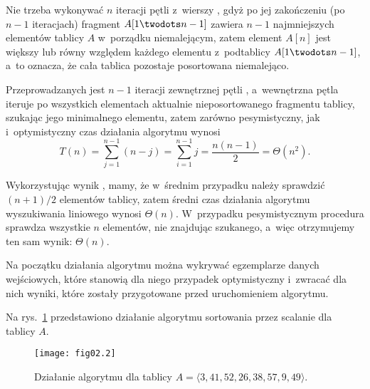 Nie trzeba wykonywać $n$ iteracji pętli  z~wierszy \twodashes{\ref{li:selection-sort-for-begin}}{\ref{li:selection-sort-for-end}}, gdyż po jej zakończeniu (po $n-1$ iteracjach) fragment $A[1\twodots n-1]$ zawiera $n-1$ najmniejszych elementów tablicy $A$ w~porządku niemalejącym, zatem element $A[n]$ jest większy lub równy względem każdego elementu z~podtablicy $A[1\twodots n-1]$, a~to oznacza, że cała tablica pozostaje posortowana niemalejąco.

Przeprowadzanych jest $n-1$ iteracji zewnętrznej pętli , a~wewnętrzna pętla  iteruje po wszystkich elementach aktualnie nieposortowanego fragmentu tablicy, szukając jego minimalnego elementu, zatem zarówno pesymistyczny, jak i~optymistyczny czas działania algorytmu wynosi
\[
	T(n) = \sum_{j=1}^{n-1}(n-j) = \sum_{i=1}^{n-1}j = \frac{n(n-1)}{2} = \Theta(n^2).
\]

\exercise %
Wykorzystując wynik , mamy, że w~średnim przypadku należy sprawdzić $(n+1)/2$ elementów tablicy, zatem średni czas działania algorytmu wyszukiwania liniowego wynosi $\Theta(n)$. W~przypadku pesymistycznym procedura sprawdza wszystkie $n$ elementów, nie znajdując szukanego, a~więc otrzymujemy ten sam wynik: $\Theta(n)$.

\exercise %
Na początku działania algorytmu można wykrywać egzemplarze danych wejściowych, które stanowią dla niego przypadek optymistyczny i~zwracać dla nich wyniki, które zostały przygotowane przed uruchomieniem algorytmu.


\exercise %
Na rys.~\ref{fig:2.3-1} przedstawiono działanie algorytmu sortowania przez scalanie dla tablicy $A$.
\begin{figure}[ht]
	\begin{center}
		\texttt{[image: fig02.2]}
	\end{center}
	\caption{Działanie algorytmu  dla tablicy $A=\langle3,41,52,26,38,57,9,49\rangle$.} \label{fig:2.3-1}
\end{figure}

